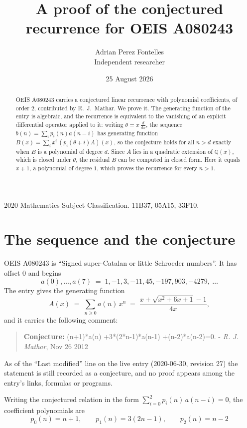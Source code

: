 \documentclass[11pt,a4paper]{article}
\title{A proof of the conjectured recurrence for OEIS A080243}
\author{Adrian Perez Fontelles\\ \small Independent researcher}
\date{25 August 2026}
\theoremstyle{plain}
\theoremstyle{definition}
\begin{document}
\maketitle

\begin{abstract}
OEIS A080243 carries a conjectured linear recurrence with polynomial coefficients, of
order 2, contributed by R.~J.~Mathar. We prove it. The generating function of the
entry is algebraic, and the recurrence is equivalent to the vanishing of an explicit
differential operator applied to it: writing $\theta=x\,\frac{d}{dx}$, the sequence
$b(n)=\sum_{i}p_{i}(n)a(n-i)$ has generating function
$B(x)=\sum_{i}x^{i}\,(p_{i}(\theta+i)A)(x)$, so the conjecture holds for all $n>d$ exactly
when $B$ is a polynomial of degree $d$. Since $A$ lies in a quadratic extension of
$\mathbb{Q}(x)$, which is closed under $\theta$, the residual $B$ can be computed in
closed form. Here it equals $x + 1$, a polynomial of degree $1$, which proves
the recurrence for every $n>1$.
\end{abstract}

\noindent\small 2020 Mathematics Subject Classification. 11B37, 05A15, 33F10.\normalsize

\section{The sequence and the conjecture}

OEIS A080243 is ``Signed super-Catalan or little Schroeder numbers''. It has offset $0$ and begins
\[
a(0),\dots,a(7)\;=\;1, -1, 3, -11, 45, -197, 903, -4279,\ \dots
\]
The entry gives the generating function
\begin{equation}\label{eq:gf}
A(x)\;=\;\sum_{n\ge 0} a(n)\,x^{n}\;=\;\frac{x + \sqrt{x^{2} + 6 x + 1} - 1}{4 x} ,
\end{equation}
and it carries the following comment:
\begin{quote}\small
\textbf{Conjecture:} (n+1)*a(n) +3*(2*n-1)*a(n-1) +(n-2)*a(n-2)=0. - \emph{R. J. Mathar}, Nov 26 2012
\end{quote}
As of the ``Last modified'' line on the live entry (2020-06-30, revision 27) the
statement is still recorded as a conjecture, and no proof appears among the entry's links,
formulas or programs.

Writing the conjectured relation in the form $\sum_{i=0}^{2}p_{i}(n)\,a(n-i)=0$,
the coefficient polynomials are
\[
p_{0}(n)=n + 1,\qquad p_{1}(n)=3 \left(2 n - 1\right),\qquad p_{2}(n)=n - 2
\]
\end{document}
